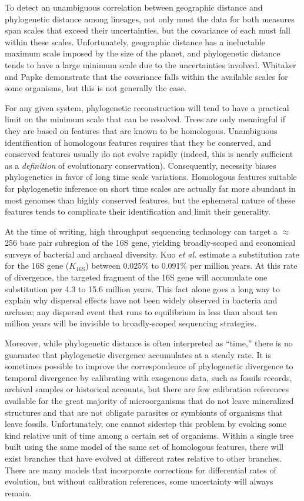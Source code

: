 To detect an unambiguous correlation between geographic distance and phylogenetic distance among lineages, not only must the data for both measures span scales that exceed their uncertainties, but the covariance of each must fall within these scales. Unfortunately, geographic distance has a ineluctable maximum scale imposed by the size of the planet, and phylogenetic distance tends to have a large minimum scale due to the uncertainties involved. Whitaker and Papke demonstrate that the covariance falls within the available scales for some organisms, but this is not generally the case.

For any given system, phylogenetic reconstruction will tend to have a practical limit on the minimum scale that can be resolved. Trees are only meaningful if they are based on features that are known to be homologous. Unambiguous identification of homologous features requires that they be conserved, and conserved features usually do not evolve rapidly (indeed, this is nearly sufficient as a {\em definition} of evolutionary conservation). Consequently, necessity biases phylogenetics in favor of long time scale variations. Homologous features suitable for phylogenetic inference on short time scales are actually far more abundant in most genomes than highly conserved features, but the ephemeral nature of these features tends to complicate their identification and limit their generality. 

At the time of writing, high throughput sequencing technology can target a $\approx$ 256 base pair subregion of the 16S gene, yielding broadly-scoped and economical surveys of bacterial and archaeal diversity. Kuo {\em et al.} estimate a substitution rate for the 16S gene ($K_{\mathrm{16S}}$) between 0.025\% to 0.091\% per million years. \cite{kuo2009inferring} At this rate of divergence, the targeted fragment of the 16S gene will accumulate one substitution per 4.3 to 15.6 million years. This fact alone goes a long way to explain why dispersal effects have not been widely observed in bacteria and archaea; any dispersal event that runs to equilibrium in less than about ten million years will be invisible to broadly-scoped sequencing strategies.

Moreover, while phylogenetic distance is often interpreted as ``time,'' there is no guarantee that phylogenetic divergence accumulates at a steady rate. It is sometimes possible to improve the correspondence of phylogenetic divergence to temporal divergence by calibrating with exogenous data, such as fossils records, archival samples or historical accounts, but there are few calibration references available for the great majority of microorganisms that do not leave mineralized structures and that are not obligate parasites or symbionts of organisms that leave fossils. Unfortunately, one cannot sidestep this problem by evoking some kind relative unit of time among a certain set of organisms. Within a single tree built using the same model of the same set of homologous features, there will exist branches that have evolved at different rates relative to other branches. There are many models that incorporate corrections for differential rates of evolution, but without calibration references, some uncertainty will always remain.

